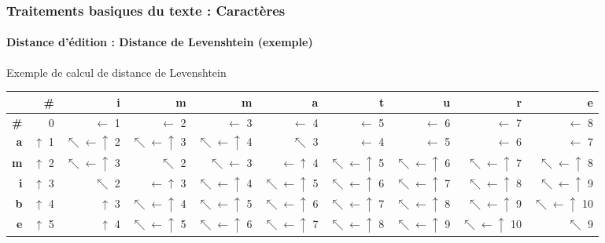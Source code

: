 \documentclass[xcolor=table]{beamer}
\begin{document}
\begin{frame}
\frametitle{Traitements basiques du texte : Caractères}
\framesubtitle{Distance d'édition : Distance de Levenshtein (exemple)}

\begin{exampleblock}{Exemple de calcul de distance de Levenshtein}
	\centering\bfseries\tiny
	\begin{tabular}{|r|r|r|r|r|r|r|r|r|r|}
		\hline
		&\bfseries \# &\bfseries i &\bfseries m &\bfseries m &\bfseries a &\bfseries t &\bfseries u &\bfseries r &\bfseries e \\
		\hline
		\bfseries \# & 0 & $ \leftarrow $ 1 & $ \leftarrow $ 2 & $ \leftarrow $ 3 & $ \leftarrow $ 4 & $ \leftarrow $ 5 & $ \leftarrow $ 6 & $ \leftarrow $ 7 & $ \leftarrow $ 8\\
		\hline
		\bfseries a & \cellcolor{green!25} $ \uparrow $ 1 & $ \nwarrow\leftarrow\uparrow $ 2 & $ \nwarrow\leftarrow\uparrow $ 3 & $ \nwarrow\leftarrow\uparrow $ 4 & $ \nwarrow $ 3 & $ \leftarrow $ 4 & $ \leftarrow $ 5 & $ \leftarrow $ 6 & $ \leftarrow $ 7 \\
		\hline
		\bfseries m & \cellcolor{green!25} $ \uparrow $ 2 & $ \nwarrow\leftarrow\uparrow $ 3 & $\nwarrow $ 2 & $\nwarrow\leftarrow $ 3 & $\leftarrow\uparrow $ 4 & $\nwarrow\leftarrow\uparrow $ 5 & $\nwarrow\leftarrow\uparrow $ 6 & $\nwarrow\leftarrow\uparrow $ 7 & $\nwarrow\leftarrow\uparrow $ 8\\
		\hline
		\bfseries i & $ \uparrow $ 3 & \cellcolor{green!25} $ \nwarrow $ 2 & \cellcolor{green!25} $\leftarrow\uparrow $ 3 & \cellcolor{green!25} $\nwarrow\leftarrow\uparrow $ 4 & \cellcolor{green!25} $\nwarrow\leftarrow\uparrow $ 5 & \cellcolor{green!25} $\nwarrow\leftarrow\uparrow $ 6 & \cellcolor{green!25} $\nwarrow\leftarrow\uparrow $ 7 & $\nwarrow\leftarrow\uparrow $ 8 & $\nwarrow\leftarrow\uparrow $ 9\\
		\hline
		\bfseries b & $ \uparrow $ 4 & $ \uparrow $ 3 & $\nwarrow\leftarrow\uparrow $ 4 & $\nwarrow\leftarrow\uparrow $ 5 & $\nwarrow\leftarrow\uparrow $ 6 & $\nwarrow\leftarrow\uparrow $ 7 & $\nwarrow\leftarrow\uparrow $ 8 & \cellcolor{green!25} $\nwarrow\leftarrow\uparrow $ 9 & $\nwarrow\leftarrow\uparrow $ 10\\
		\hline
		\bfseries e & $ \uparrow $ 5 & $ \uparrow $ 4 & $\nwarrow\leftarrow\uparrow $ 5 & $\nwarrow\leftarrow\uparrow $ 6 & $\nwarrow\leftarrow\uparrow $ 7 & $\nwarrow\leftarrow\uparrow $ 8 & $\nwarrow\leftarrow\uparrow $ 9 & $\nwarrow\leftarrow\uparrow $ 10 & \cellcolor{green!25} $\nwarrow $ 9\\
		\hline
	\end{tabular}
\end{exampleblock}

\end{frame}
\end{document}
